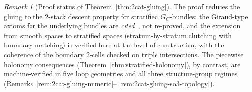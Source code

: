 \documentclass[11pt,a4paper]{article}
\theoremstyle{plain}
\theoremstyle{definition}
\theoremstyle{remark}
\newtheorem{remark}[theorem]{Remark}
\begin{document}
\begin{remark}[Proof status of Theorem~\ref{thm:2cat-gluing}]
\label{rem:gluing-proof-status}
The proof reduces the gluing to the $2$-stack descent property for
stratified $G_C$-bundles: the Giraud-type axioms for the underlying
bundles are \emph{cited}~\cite{giraud1971cohomologie,breen2001gerbes},
not re-proved, and the extension from smooth spaces to stratified
spaces (stratum-by-stratum clutching with boundary matching) is
verified here at the level of construction, with the
coherence of the boundary $2$-cells checked on triple
intersections. The piecewise holonomy consequences
(Theorem~\ref{thm:stratified-holonomy}), by contrast, are
machine-verified in five loop geometries and all three
structure-group regimes (Remarks~\ref{rem:2cat-gluing-numeric}--%
\ref{rem:2cat-gluing-so3-topology}).
\end{remark}
\end{document}
